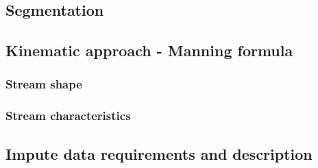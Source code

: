     \subsection{Segmentation}
    \subsection{Kinematic approach - Manning formula}
        \subsubsection{Stream shape}
        \subsubsection{Stream characteristics}
    \subsection{Impute data requirements and description}
